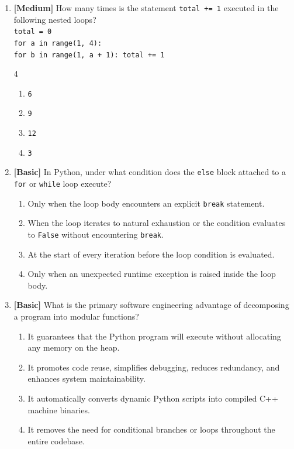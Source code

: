 \documentclass[11pt,a4paper]{article}
\begin{document}
\begin{enumerate}[label=\textbf{Q\arabic*.},leftmargin=1.8em,itemsep=0.8pt,topsep=0.3pt,resume]
\item \textbf{[Medium]} How many times is the statement \texttt{total += 1} executed in the following nested loops?\\
\texttt{total = 0}\\
\texttt{for a in range(1, 4):}\\
\texttt{\phantom{XX}for b in range(1, a + 1): total += 1}
\begin{multicols}{4}
\begin{enumerate}[label=\Alph*.]
  \item \texttt{6}
  \item \texttt{9}
  \item \texttt{12}
  \item \texttt{3}
\end{enumerate}
\end{multicols}

\item \textbf{[Basic]} In Python, under what condition does the \texttt{else} block attached to a \texttt{for} or \texttt{while} loop execute?
\begin{enumerate}[label=\Alph*.,leftmargin=1.8em]
  \item Only when the loop body encounters an explicit \texttt{break} statement.
  \item When the loop iterates to natural exhaustion or the condition evaluates to \texttt{False} without encountering \texttt{break}.
  \item At the start of every iteration before the loop condition is evaluated.
  \item Only when an unexpected runtime exception is raised inside the loop body.
\end{enumerate}

\item \textbf{[Basic]} What is the primary software engineering advantage of decomposing a program into modular functions?
\begin{enumerate}[label=\Alph*.,leftmargin=1.8em]
  \item It guarantees that the Python program will execute without allocating any memory on the heap.
  \item It promotes code reuse, simplifies debugging, reduces redundancy, and enhances system maintainability.
  \item It automatically converts dynamic Python scripts into compiled C++ machine binaries.
  \item It removes the need for conditional branches or loops throughout the entire codebase.
\end{enumerate}


\end{enumerate}
\end{document}
